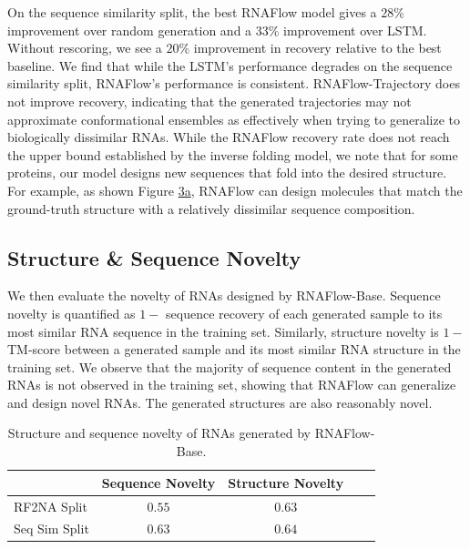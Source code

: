 On the sequence similarity split, the best RNAFlow model gives a $28\%$ improvement over random generation and a $33\%$ improvement over LSTM. Without rescoring, we see a $20\%$ improvement in recovery relative to the best baseline. We find that while the LSTM's performance degrades on the sequence similarity split, RNAFlow's performance is consistent. RNAFlow-Trajectory does not improve recovery, indicating that the generated trajectories may not approximate conformational ensembles as effectively when trying to generalize to biologically dissimilar RNAs. While the RNAFlow recovery rate does not reach the upper bound established by the inverse folding model, we note that for some proteins, our model designs new sequences that fold into the desired structure. For example, as shown Figure \hyperref[fig:3]{3a}, RNAFlow can design molecules that match the ground-truth structure with a relatively dissimilar sequence composition.


\subsection{Structure \& Sequence Novelty}
\label{sec:4.2}

We then evaluate the novelty of RNAs designed by RNAFlow-Base. Sequence novelty is quantified as $1 -$ sequence recovery of each generated sample to its most similar RNA sequence in the training set. Similarly, structure novelty is $1 - $ TM-score between a generated sample and its most similar RNA structure in the training set. We observe that the majority of sequence content in the generated RNAs is not observed in the training set, showing that RNAFlow can generalize and design novel RNAs. The generated structures are also reasonably novel.

\begin{table}[h]
    \centering
    \small
    \caption{Structure and sequence novelty of RNAs generated by RNAFlow-Base.}
    \vspace{0.05in}
    \renewcommand\thetable{3}
    \begin{tabular} {lcc@{\hskip 0.25in}cc}
        \hline
        & Sequence Novelty & Structure Novelty \\ \hline
        RF2NA Split & $0.55$ & $0.63$ \\
       Seq Sim Split & $0.63$ & $0.64$ \\
    \hline
    \end{tabular}
    \label{tab:3}
\end{table}

